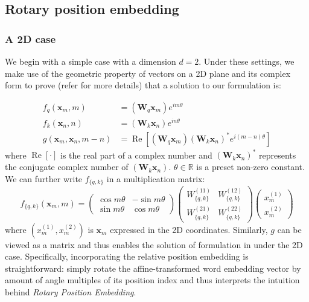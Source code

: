 \documentclass{article}
\def\x{{\boldsymbol x}}
\def\W{{\boldsymbol W}}
\begin{document}
\subsection{Rotary position embedding}
\label{sec:RoPE}

\subsubsection{A 2D case}
We begin with a simple case with a dimension $d=2$. Under these settings, we make use of the geometric property of vectors on a 2D plane and its complex form to prove (refer  for more details) that a solution to our formulation  is: 

\begin{equation}
	\begin{aligned}
		f_q(\x_m, m) &= (\W_q\x_m)e^{im\theta}\\
		f_k(\x_n, n) &= (\W_k\x_n)e^{in\theta}\\
		g(\x_m, \x_n, m - n) &= \operatorname{Re}[(\W_q\x_m)(\W_k\x_n)^{*}e^{i(m - n)\theta}]
	\end{aligned}
	\label{fn:res-2d}
\end{equation}
where $\operatorname{Re}[\cdot]$ is the real part of a complex number and $(\W_k\x_n)^{*}$ represents the conjugate complex number of $(\W_k\x_n)$. $\theta \in \mathbb{R}$ is a preset non-zero constant. We can further write $f_{\{q, k\}}$ in a multiplication matrix: 
\begin{equation}
	f_{\{q, k\}}(\x_m, m) = \left(
	\begin{array}{cc}
		\cos{m\theta}& -\sin{m\theta}  \\
		\sin{m\theta}&\cos{m\theta} 
	\end{array}
	\right)
	\left(
	\begin{array}{cc}
		W^{(11)}_{\{q, k\}} & W^{(12)}_{\{q, k\}} \\
		W^{(21)}_{\{q, k\}} & W^{(22)}_{\{q, k\}}
	\end{array}
	\right)
	\left(
	\begin{array}{cc}
		x^{(1)}_m\\
		x^{(2)}_m
	\end{array}
	\right)
\end{equation}
where $(x^{(1)}_m, x^{(2)}_m)$ is $\x_m$ expressed in the 2D coordinates. Similarly, $g$ can be viewed as a matrix  and thus enables the solution of formulation in  under the 2D case. Specifically, incorporating the relative position embedding is straightforward: simply rotate the affine-transformed word embedding vector by amount of angle multiples of its position index and thus interprets the intuition behind \textit{Rotary Position Embedding}. 
\end{document}
